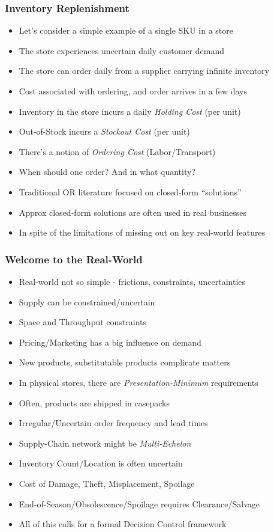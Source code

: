 \documentclass[handout]{beamer}
\begin{document}
\begin{frame}
\frametitle{Inventory Replenishment}
\pause
\begin{itemize}[<+->]
\item Let's consider a simple example of a single SKU in a store
\item The store experiences uncertain daily customer demand
\item The store can order daily from a supplier carrying infinite inventory
\item Cost associated with ordering, and order arrives in a few days
\item Inventory in the store incurs a daily {\em Holding Cost} (per unit)
\item Out-of-Stock incurs a {\em Stockout Cost} (per unit)
\item There's a notion of {\em Ordering Cost} (Labor/Transport)
\item When should one order? And in what quantity?
\item Traditional OR literature focused on closed-form ``solutions''
\item Approx closed-form solutions are often used in real businesses
\item In spite of the limitations of missing out on key real-world features
\end{itemize}
\end{frame}


\begin{frame}
\frametitle{Welcome to the Real-World}
\pause
\begin{itemize}[<+->]
\item Real-world not so simple - frictions, constraints, uncertainties
\item Supply can be constrained/uncertain
\item Space and Throughput constraints
\item Pricing/Marketing has a big influence on demand
\item New products, substitutable products complicate matters
\item In physical stores, there are {\em Presentation-Minimum} requirements
\item Often, products are shipped in casepacks
\item Irregular/Uncertain order frequency and lead times
\item Supply-Chain network might be {\em Multi-Echelon}
\item Inventory Count/Location is often uncertain
\item Cost of Damage, Theft, Misplacement, Spoilage
\item End-of-Season/Obsolescence/Spoilage requires Clearance/Salvage
\item All of this calls for a formal Decision Control framework
\end{itemize}
\end{frame}
\end{document}
